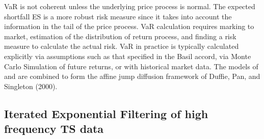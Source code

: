 VaR is not coherent unless the underlying price process is
normal.  The expected shortfall ES is a more robust risk
measure since it takes into account the information in the tail
of the price process.  VaR calculation requires marking to
market, estimation of the distribution of return process, and
finding a risk measure to calculate the actual risk.  VaR in
practice is typically calculated explicitly via assumptions
such as that specified in the Basil accord, via Monte Carlo
Simulation of future returns, or with historical market data.
The models of \cite{Heston (1993)} and \cite{Merton (1976} are
combined to form the affine jump diffusion framework of Duffie,
Pan, and Singleton (2000).

\subsection{Iterated Exponential Filtering of high frequency TS data}
